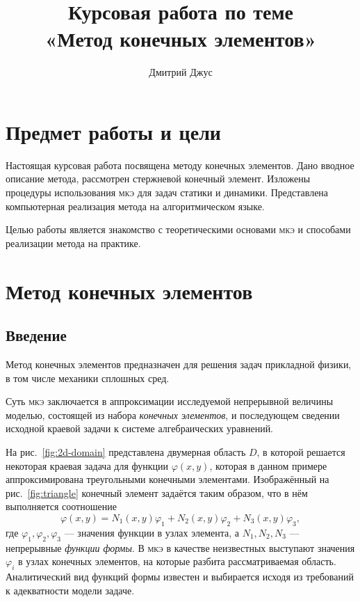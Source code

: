 \documentclass[10pt]{article}
\numberwithin{equation}{section}
\renewcommand{\phi}{\varphi}
\newcommand{\neword}{\emph}
\newcommand{\fem}{\textsc{мкэ}}
\newcommand{\figref}[1]{рис. \ref{#1}}
\begin{document}
\author{Дмитрий Джус}
\title{Курсовая работа по теме \\
  \Huge{«Метод конечных элементов»}}
\pretitle{\begin{center}\LARGE}
  \posttitle{\par\end{center}\vskip 3pc}
\date{}
\maketitle
\thispagestyle{empty}

\clearpage
\tableofcontents

\clearpage
\section*{Предмет работы и цели}

Настоящая курсовая работа посвящена методу конечных элементов. Дано
вводное описание метода, рассмотрен стержневой конечный элемент.
Изложены процедуры использования \fem{} для задач статики и динамики.
Представлена компьютерная реализация метода на алгоритмическом языке.

Целью работы является знакомство с теоретическими основами \fem{} и
способами реализации метода на практике.

\clearpage
\section{Метод конечных элементов}

\subsection{Введение}
\label{sec:intro}

Метод конечных элементов предназначен для решения задач
прикладной физики, в том числе механики сплошных сред.

Суть \fem{} заключается в аппроксимации исследуемой непрерывной
величины моделью, состоящей из набора \neword{конечных элементов}, и
последующем сведении исходной краевой задачи к системе алгебраических
уравнений.





На \figref{fig:2d-domain} представлена двумерная область $D$, в
которой решается некоторая краевая задача для функции $\phi(x, y)$,
которая в данном примере аппроксимирована треугольными конечными
элементами. Изображённый на \figref{fig:triangle} конечный элемент
задаётся таким образом, что в нём выполняется соотношение
\begin{equation}
  \label{eq:triangle-shape}
  \phi(x,y) = N_1(x, y) \phi_1 + N_2(x, y) \phi_2 + N_3(x, y) \phi_3,
\end{equation}
где $\phi_1,\phi_2,\phi_3$ — значения функции в узлах элемента, а
$N_1, N_2, N_3$ — непрерывные \neword{функции формы}. В \fem{} в
качестве неизвестных выступают значения $\phi_i$ в узлах конечных
элементов, на которые разбита рассматриваемая область. Аналитический
вид функций формы известен и выбирается исходя из требований к
адекватности модели задаче.
\end{document}
